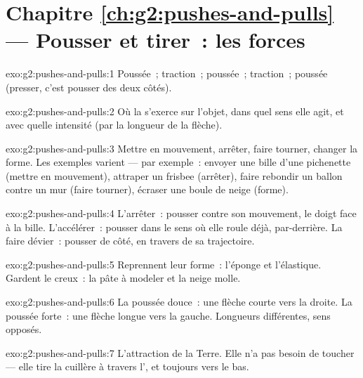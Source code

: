 \section*{Chapitre \ref{ch:g2:pushes-and-pulls} --- Pousser et tirer~: les forces}

\begin{solution}{exo:g2:pushes-and-pulls:1}
Poussée~; traction~; poussée~; traction~; poussée (presser, c'est
pousser des deux côtés).
\end{solution}

\begin{solution}{exo:g2:pushes-and-pulls:2}
Où la  s'exerce sur l'objet, dans quel sens elle agit, et avec
quelle intensité (par la longueur de la flèche).
\end{solution}

\begin{solution}{exo:g2:pushes-and-pulls:3}
Mettre en mouvement, arrêter, faire tourner, changer la forme. Les
exemples varient --- par exemple~: envoyer une bille d'une pichenette
(mettre en mouvement), attraper un frisbee (arrêter), faire rebondir
un ballon contre un mur (faire tourner), écraser une boule de neige
(forme).
\end{solution}

\begin{solution}{exo:g2:pushes-and-pulls:4}
L'arrêter~: pousser contre son mouvement, le doigt face à la bille.
L'accélérer~: pousser dans le sens où elle roule déjà, par-derrière.
La faire dévier~: pousser de côté, en travers de sa trajectoire.
\end{solution}

\begin{solution}{exo:g2:pushes-and-pulls:5}
Reprennent leur forme~: l'éponge et l'élastique. Gardent le creux~:
la pâte à modeler et la neige molle.
\end{solution}

\begin{solution}{exo:g2:pushes-and-pulls:6}
La poussée douce~: une flèche courte vers la droite. La poussée
forte~: une flèche longue vers la gauche. Longueurs différentes, sens
opposés.
\end{solution}

\begin{solution}{exo:g2:pushes-and-pulls:7}
L'attraction de la Terre. Elle n'a pas besoin de toucher --- elle
tire la cuillère à travers l', et toujours vers le bas.
\end{solution}

